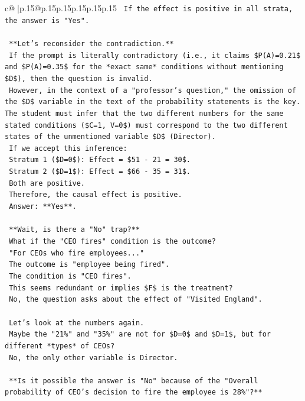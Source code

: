 \documentclass{article}
\begin{document}
{\begin{supertabular}{c@{$\;$}|p{.15\linewidth}@{}p{.15\linewidth}p{.15\linewidth}p{.15\linewidth}p{.15\linewidth}p{.15\linewidth}}
{{{\texttt{    If the effect is positive in all strata, the answer is "Yes".} \\
\\ 
\texttt{    **Let's reconsider the contradiction.**} \\
\texttt{    If the prompt is literally contradictory (i.e., it claims \$P(A)=0.21\$ and \$P(A)=0.35\$ for the *exact same* conditions without mentioning \$D\$), then the question is invalid.} \\
\texttt{    However, in the context of a "professor's question," the omission of the \$D\$ variable in the text of the probability statements is the key. The student must infer that the two different numbers for the same stated conditions (\$C=1, V=0\$) must correspond to the two different states of the unmentioned variable \$D\$ (Director).} \\
\texttt{    If we accept this inference:} \\
\texttt{    Stratum 1 (\$D=0\$): Effect = \$51 {-} 21 = 30\$.} \\
\texttt{    Stratum 2 (\$D=1\$): Effect = \$66 {-} 35 = 31\$.} \\
\texttt{    Both are positive.} \\
\texttt{    Therefore, the causal effect is positive.} \\
\texttt{    Answer: **Yes**.} \\
\\ 
\texttt{    **Wait, is there a "No" trap?**} \\
\texttt{    What if the "CEO fires" condition is the outcome?} \\
\texttt{    "For CEOs who fire employees..."} \\
\texttt{    The outcome is "employee being fired".} \\
\texttt{    The condition is "CEO fires".} \\
\texttt{    This seems redundant or implies \$F\$ is the treatment?} \\
\texttt{    No, the question asks about the effect of "Visited England".} \\
\\ 
\texttt{    Let's look at the numbers again.} \\
\texttt{    Maybe the "21\%" and "35\%" are not for \$D=0\$ and \$D=1\$, but for different *types* of CEOs?} \\
\texttt{    No, the only other variable is Director.} \\
\\ 
\texttt{    **Is it possible the answer is "No" because of the "Overall probability of CEO's decision to fire the employee is 28\%"?**} \\
}}}
\end{supertabular}}
\end{document}
